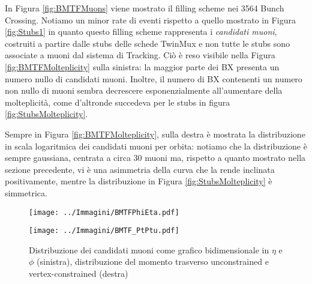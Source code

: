 In Figura \ref{fig:BMTFMuons} viene mostrato il filling scheme nei 3564 Bunch Crossing. Notiamo un minor rate di eventi rispetto a quello mostrato in Figura \ref{fig:Stubs1} in quanto questo filling scheme rappresenta i \textit{candidati muoni}, costruiti a partire dalle stubs delle schede TwinMux e non tutte le stubs sono associate a muoni dal sistema di Tracking. Ciò è reso visibile nella Figura \ref{fig:BMTFMolteplicity} sulla sinistra: la maggior parte dei BX presenta un numero nullo di candidati muoni. Inoltre, il numero di BX contenenti un numero non nullo di muoni sembra decrescere esponenzialmente all’aumentare della molteplicità, come d'altronde succedeva per le stubs in figura \ref{fig:StubsMolteplicity}.

Sempre in Figura \ref{fig:BMTFMolteplicity}, sulla destra è mostrata la distribuzione in scala logaritmica dei candidati muoni per orbita: notiamo che la distribuzione è sempre gaussiana, centrata a circa 30 muoni ma, rispetto a quanto mostrato nella sezione precedente, vi è una asimmetria della curva che la rende inclinata positivamente, mentre la distribuzione in Figura \ref{fig:StubsMolteplicity} è simmetrica.

\begin{figure}[t]
  \centering
  \begin{minipage}[b]{0.51\textwidth}
    \centering
    \texttt{[image: ../Immagini/BMTFPhiEta.pdf]} 
    \end{minipage}
    \hfill 
    \begin{minipage}[b]{0.48\textwidth}
      \centering
      \texttt{[image: ../Immagini/BMTF\_PtPtu.pdf]} 
    \end{minipage}
    \caption{Distribuzione dei candidati muoni come grafico bidimensionale in $\eta$ e $\phi$ (sinistra), distribuzione del momento trasverso unconstrained e vertex-constrained (destra)}
  \label{fig:BMTFPt}
\end{figure}

